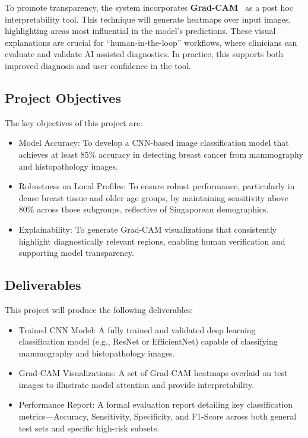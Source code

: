 \documentclass[12pt]{article}
\begin{document}
To promote transparency, the system incorporates \textbf{Grad-CAM}~\cite{5} as a post hoc interpretability tool. This technique will generate heatmaps over input images, highlighting areas most influential in the model’s predictions. These visual explanations are crucial for ``human-in-the-loop'' workflows, where clinicians can evaluate and validate AI assisted diagnostics. In practice, this supports both improved diagnosis and user confidence in the tool.

\subsection{Project Objectives}
\label{sec:objectives}
The key objectives of this project are:
\begin{itemize}
    \item {Model Accuracy:} To develop a CNN-based image classification model that achieves at least {85\% accuracy} in detecting breast cancer from mammography and histopathology images.
    \item {Robustness on Local Profiles:} To ensure robust performance, particularly in {dense breast tissue and older age groups}, by maintaining {sensitivity above 80\%} across those subgroups, reflective of Singaporean demographics.
    \item {Explainability:} To generate {Grad-CAM visualizations} that consistently highlight diagnostically relevant regions, enabling human verification and supporting model transparency.
\end{itemize}

\subsection{Deliverables}
This project will produce the following deliverables:
\begin{itemize}
    \item {Trained CNN Model:} A fully trained and validated deep learning classification model (e.g., ResNet or EfficientNet) capable of classifying mammography and histopathology images.
    \item {Grad-CAM Visualizations:} A set of Grad-CAM heatmaps overlaid on test images to illustrate model attention and provide interpretability.
    \item {Performance Report:} A formal evaluation report detailing key classification metrics—{Accuracy, Sensitivity, Specificity, and F1-Score} across both general test sets and specific high-risk subsets.
\end{itemize}
\newpage
\end{document}
